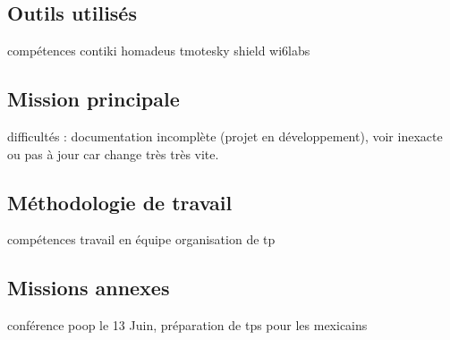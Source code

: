 \documentclass{article}
\begin{document}
\subsection{Outils utilisés}
compétences
contiki
homadeus
tmotesky
shield wi6labs
\subsection{Mission principale}
difficultés : documentation incomplète (projet en développement), voir inexacte ou pas à jour car change très très vite.
\subsection{Méthodologie de travail}
compétences
travail en équipe
organisation de tp
\subsection{Missions annexes}
conférence poop le 13 Juin, préparation de tps pour les mexicains
\end{document}
